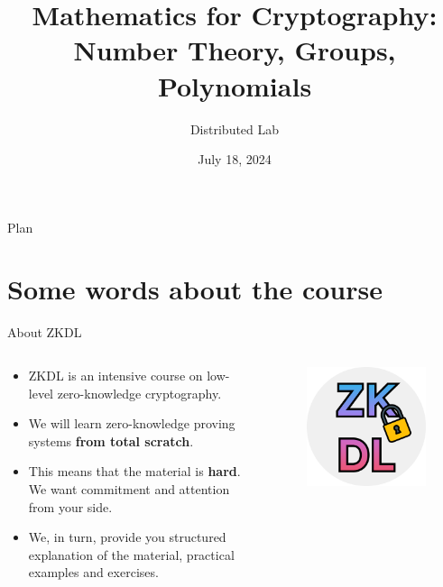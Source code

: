 \documentclass{beamer}
\title[Mathematics I]{\textbf{Mathematics for Cryptography: Number Theory, Groups, Polynomials}}
\author{Distributed Lab}
\date{July 18, 2024}
\begin{document}
    \frame {
      \titlepage
    }
  
    \begin{frame}{Plan}
      \tableofcontents
    \end{frame}

    \section{Some words about the course}
    \begin{frame}{About ZKDL} 

      \begin{columns}
        \begin{column}{0.7\textwidth}
          \begin{itemize}
            \item ZKDL is an intensive course on low-level zero-knowledge cryptography.
            \item We will learn zero-knowledge proving systems \textbf{from total scratch}.
            \item This means that the material is \textbf{hard}. We want commitment and attention from your side.
            \item We, in turn, provide you structured explanation of the material, practical examples and exercises.
          \end{itemize}
        \end{column}
        \begin{column}{0.3\textwidth}
            \begin{figure}
            \centering
                \includegraphics[width=1\textwidth]{images/logo.png}
            \end{figure}
        \end{column}
        \end{columns}


\end{frame}
\end{document}
